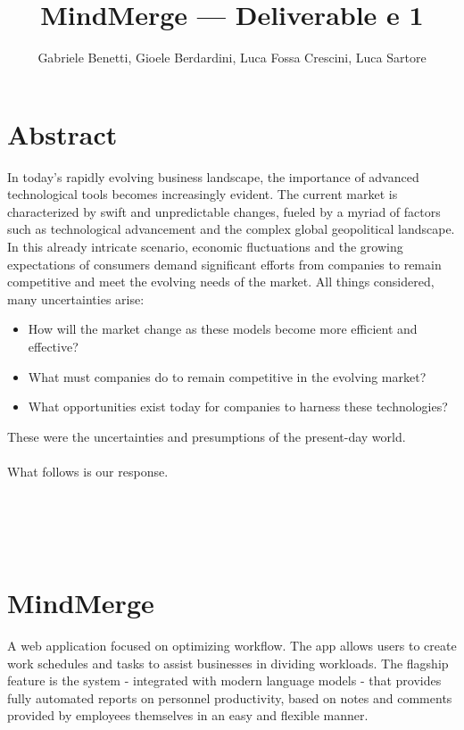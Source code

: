 \documentclass{article}
\title{MindMerge --- Deliverable e 1}
\author{Gabriele Benetti, Gioele Berdardini, Luca Fossa Crescini, Luca Sartore}
\begin{document}
\maketitle


\tableofcontents


\newpage
{}
\section*{Abstract}   %
In today's rapidly evolving business landscape, the importance of advanced technological tools becomes increasingly evident. 
The current market is characterized by swift and unpredictable changes, fueled by a myriad of factors such as technological advancement and the complex global geopolitical landscape. 
In this already intricate scenario, economic fluctuations and the growing expectations of consumers 
demand significant efforts from companies to remain competitive 
and meet the evolving needs of the market. All things considered, many uncertainties arise:

\begin{itemize}
    \item How will the market change as these models become more efficient and effective?
    \item What must companies do to remain competitive in the evolving market?
    \item What opportunities exist today for companies to harness these technologies?
\end{itemize}
These were the uncertainties and presumptions of the present-day world.\\
\\
What follows is our response.
\\
\\
\\
\\
\\

\section*{MindMerge}
A web application focused on optimizing workflow. 
The app allows users to create work schedules and tasks to assist businesses in dividing workloads. 
The flagship feature is the system - integrated with modern language models - that provides fully automated reports on personnel productivity, based on notes and comments provided by employees themselves in an easy and flexible manner.
\pagebreak
\restoregeometry
\end{document}
